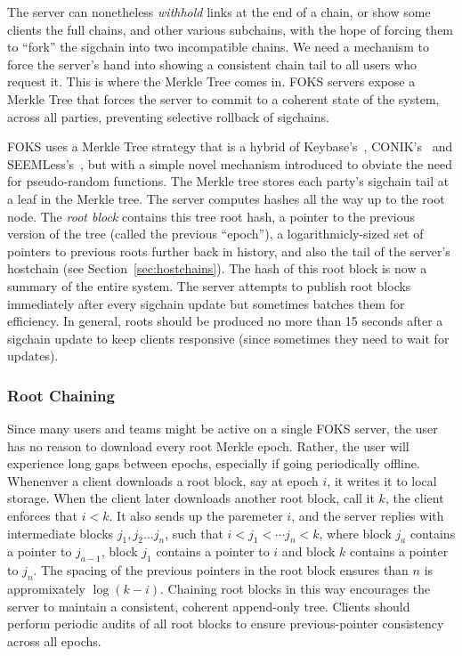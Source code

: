 The server can nonetheless \textit{withhold} links at the end of a chain, 
or show some clients the full chains, and other various subchains, with the
hope of forcing them to ``fork'' the sigchain into two incompatible chains.
We need a mechanism to force the server's hand into showing a consistent 
chain tail to all users who request it. This is where the Merkle Tree
comes in. FOKS servers expose a Merkle Tree that forces the server to commit
to a coherent state of the system, across all parties, preventing selective
rollback of sigchains. 

FOKS uses a Merkle Tree strategy that is a hybrid of Keybase's~\cite{keybase},
CONIK's~\cite{melara2015coniks} and SEEMLess's~\cite{chase2019seemless}, but
with a simple novel mechanism introduced to obviate the need for pseudo-random
functions. The Merkle tree stores each party's sigchain tail at a leaf 
in the Merkle tree. The server computes hashes all the way up to the root node.
The \textit{root block} contains this tree root hash, a pointer to the previous version of
the tree (called the previous ``epoch''), a logarithmicly-sized set of pointers
to previous roots further back in history, and also the tail of the 
server's hostchain (see Section~\ref{sec:hostchains}). The hash of this
root block is now a summary of the entire system. The server attempts to publish
root blocks immediately after every sigchain update but sometimes batches 
them for efficiency. In general, roots should be produced no more than
15 seconds after a sigchain update to keep clients responsive (since sometimes
they need to wait for updates).

\subsubsection{Root Chaining}

Since many users and teams might be active on a single FOKS server, 
the user has no reason to download every root Merkle epoch. Rather,
the user will experience long gaps between epochs, especially if going
periodically offline. Whenenver a client downloads a root block,
say at epoch $i$, it writes it to local storage. When the client later
downloads another root block, call it $k$, the client enforces
that $i < k$. It also sends up the paremeter $i$, and the server
replies with intermediate blocks $j_1, j_2 \dots j_n$, such that
$i < j_1 < \cdots j_n < k$,  where block $j_{a}$ contains
a pointer to $j_{a-1}$, block $j_1$ contains a pointer to $i$
and block $k$ contains a pointer to $j_n$. The spacing of the
previous pointers in the root block ensures than $n$ is appromixately
$\log (k-i)$. Chaining root blocks in this way 
encourages the server to maintain a consistent, coherent append-only
tree. Clients should perform periodic audits of all root blocks
to ensure previous-pointer consistency across all epochs.

